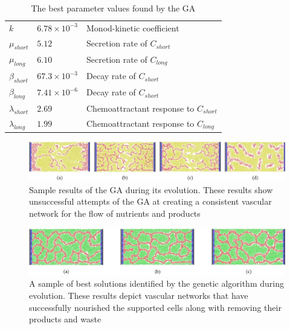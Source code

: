 \begin{table}[ht]
\caption{The best parameter values found by the GA} %
\centering
\begin{footnotesize}
\begin{tabular}{l l l}
\hline

$k$          & $6.78 \times 10^{-3}$                 & Monod-kinetic coefficient \\
$\mu_{short}$ & $5.12$                 & Secretion rate of $C_{short}$\\
$\mu_{long}$  & $6.10$                 & Secretion rate of $C_{long}$ \\
$\beta_{short} $    &  $67.3 \times 10^{-3}$         & Decay rate of $C_{short}$\\
$\beta_{long} $    &  $7.41 \times 10^{-6}$           & Decay rate of $C_{short}$\\
$\lambda_{short} $    &  $2.69$          & Chemoattractant response to $C_{short}$\\
$\lambda_{long} $    &  $1.99$           & Chemoattractant response to $C_{long}$\\
[1ex]      %

\hline
\end{tabular}
\end{footnotesize}
\label{results}
\end{table}

\begin{figure}[ht]
 \begin{center}
  \includegraphics[width=\textwidth]{./results/bad factories.jpg}
 \end{center}
  \caption{Sample results of the GA during its evolution. These results show unsuccessful attempts of the GA at creating a consistent vascular network for the flow of nutrients and products}
\label{badFactories}
\end{figure}

\begin{figure}[ht]
 \begin{center}
  \includegraphics[width=\textwidth]{./results/good factories.jpg}
 \end{center}
  \caption{A sample of best solutions identified by the genetic algorithm during evolution. These results depict vascular networks that have successfully nourished the supported cells along with removing their products and waste}
\label{goodFactories}
\end{figure}

